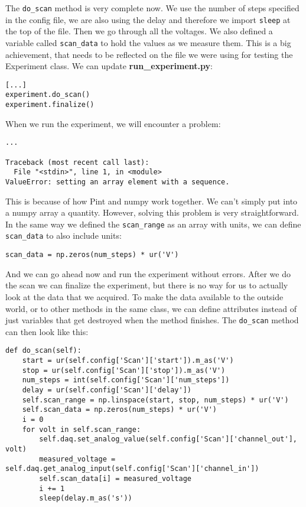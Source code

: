 The \texttt{do\_scan} method is very complete now. We use the number of steps specified in the config file, we are also using the delay and therefore we import \texttt{sleep} at the top of the file. Then we go through all the voltages. We also defined a variable called \texttt{scan\_data} to hold the values as we measure them. This is a big achievement, that needs to be reflected on the file we were using for testing the Experiment class. We can update \textbf{run\_experiment.py}:

\begin{verbatim}
[...]
experiment.do_scan()
experiment.finalize()
\end{verbatim}

When we run the experiment, we will encounter a problem:

\begin{verbatim}
...

Traceback (most recent call last):
  File "<stdin>", line 1, in <module>
ValueError: setting an array element with a sequence.
\end{verbatim}

This is because of how Pint and numpy work together. We can't simply put into a numpy array a quantity. However, solving this problem is very straightforward. In the same way we defined the \texttt{scan\_range} as an array with units, we can define \texttt{scan\_data} to also include units:

\begin{verbatim}
scan_data = np.zeros(num_steps) * ur('V')
\end{verbatim}

And we can go ahead now and run the experiment without errors. After we do the scan we can finalize the experiment, but there is no way for us to actually look at the data that we acquired. To make the data available to the outside world, or to other methods in the same class, we can define attributes instead of just variables that get destroyed when the method finishes. The \texttt{do\_scan} method can then look like this:

\begin{verbatim}
def do_scan(self):
    start = ur(self.config['Scan']['start']).m_as('V')
    stop = ur(self.config['Scan']['stop']).m_as('V')
    num_steps = int(self.config['Scan']['num_steps'])
    delay = ur(self.config['Scan']['delay'])
    self.scan_range = np.linspace(start, stop, num_steps) * ur('V')
    self.scan_data = np.zeros(num_steps) * ur('V')
    i = 0
    for volt in self.scan_range:
        self.daq.set_analog_value(self.config['Scan']['channel_out'], volt)
        measured_voltage = self.daq.get_analog_input(self.config['Scan']['channel_in'])
        self.scan_data[i] = measured_voltage
        i += 1
        sleep(delay.m_as('s'))
\end{verbatim}

